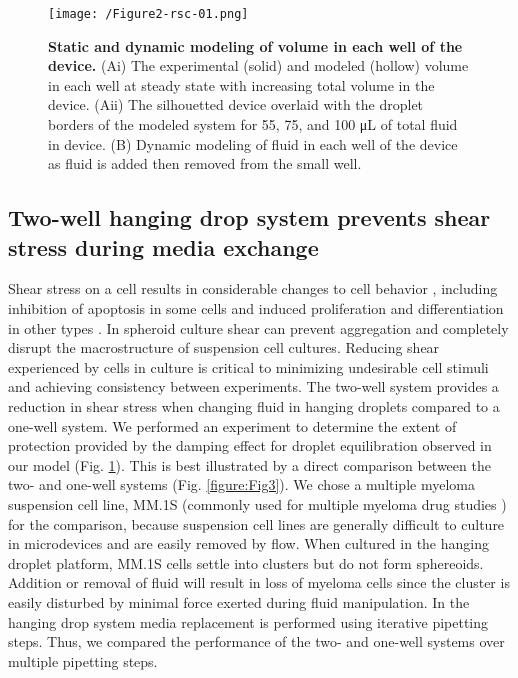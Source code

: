 \begin{figure}[ht] %
\centering
\texttt{[image: /Figure2-rsc-01.png]}
\caption{\textbf{Static and dynamic modeling of volume in each well of the device.} (Ai) The experimental (solid) and modeled (hollow) volume in each well at steady state with increasing total volume in the device. (Aii) The silhouetted device overlaid with the droplet borders of the modeled system for 55, 75, and 100 μL of total fluid in device. (B) Dynamic modeling of fluid in each well of the device as fluid is added then removed from the small well.}
\label{figure:Fig2}
\end{figure}


\subsection{Two-well hanging drop system prevents shear stress during media exchange}
Shear stress on a cell results in considerable changes to cell behavior \cite{White2007}, including inhibition of apoptosis in some cells \cite{Dimmeler1996} and induced proliferation and differentiation in other types \cite{Yamamoto2003}. In spheroid culture shear can prevent aggregation and completely disrupt the macrostructure of suspension cell cultures. Reducing shear experienced by cells in culture is critical to minimizing undesirable cell stimuli and achieving consistency between experiments. The two-well system provides a reduction in shear stress when changing fluid in hanging droplets compared to a one-well system. We performed an experiment to determine the extent of protection provided by the damping effect for droplet equilibration observed in our model (Fig. \ref{figure:Fig2}). This is best illustrated by a direct comparison between the two- and one-well systems (Fig. \ref{figure:Fig3}). We chose a multiple myeloma suspension cell line, MM.1S (commonly used for multiple myeloma drug studies \cite{Greenstein2003, Tai2006, Azab2009}) for the comparison, because suspension cell lines are generally difficult to culture in microdevices and are easily removed by flow. When cultured in the hanging droplet platform, MM.1S cells settle into clusters but do not form sphereoids. Addition or removal of fluid will result in loss of myeloma cells since the cluster is easily disturbed by minimal force exerted during fluid manipulation. In the hanging drop system media replacement is performed using iterative pipetting steps. Thus, we compared the performance of the two- and one-well systems over multiple pipetting steps.
